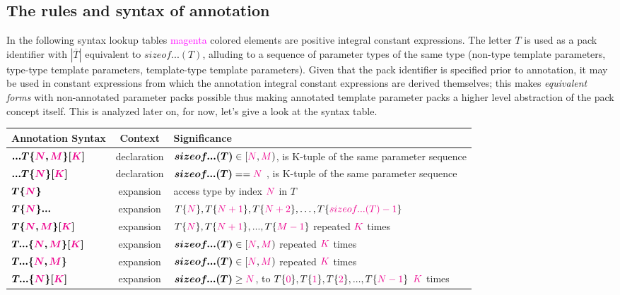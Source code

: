 
\subsection{The rules and syntax of annotation}

\p In the following syntax lookup tables \textcolor{Magenta}{magenta} colored elements are positive integral constant expressions.
The letter $T$ is used as a pack identifier with $|\overline{T}|$ equivalent to $sizeof...(T)$, alluding to a sequence of parameter types of the same type (non-type template parameters, type-type template parameters, template-type template parameters).
Given that the pack identifier is specified prior to annotation, it may be used in constant expressions from which the annotation integral constant expressions are derived themselves; this makes \textit{equivalent forms} with non-annotated parameter packs possible thus making annotated template parameter packs a higher level abstraction of the pack concept itself.
This is analyzed later on, for now, let's give a look at the syntax table.

\begin{tabularx}{\textwidth}{l|c|X}
  \textbf{Annotation Syntax} & \textbf{Context}  &\textbf{Significance} \\
\hline
$\bm{...T\{\textcolor{Magenta}{\textcolor{Magenta}{N}},\textcolor{Magenta}{M}\}[\textcolor{Magenta}{K}]}$ & declaration & $\bm{sizeof...(T)} \in [\textcolor{Magenta}{N},\textcolor{Magenta}{M})$, is K-tuple of the same parameter sequence \\
$\bm{...T\{\textcolor{Magenta}{N}\}[\textcolor{Magenta}{K}]}$ & declaration & $\bm{sizeof...(T)} == \textcolor{Magenta}{N}$ , is K-tuple of the same parameter sequence \\
$\bm{T\{\textcolor{Magenta}{N}\}}$ & expansion & access type by index $\textcolor{Magenta}{N}$ in $T$ \\
$\bm{T\{\textcolor{Magenta}{N}\}...}$ & expansion& $T\{\textcolor{Magenta}{N}\},T\{\textcolor{Magenta}{N+1}\},T\{\textcolor{Magenta}{N+2}\},\dots{},T\{\textcolor{Magenta}{sizeof...(T)-1}\}$ \\
$\bm{T\{\textcolor{Magenta}{N},\textcolor{Magenta}{M}\}[\textcolor{Magenta}{K}]}$ & expansion & $T\{\textcolor{Magenta}{N}\},T\{\textcolor{Magenta}{N+1}\},...,T\{\textcolor{Magenta}{M-1}\}$ repeated $\textcolor{Magenta}{K}$ times \\
$\bm{T...\{\textcolor{Magenta}{N},\textcolor{Magenta}{M}\}[\textcolor{Magenta}{K}]}$ & expansion & $\bm{sizeof...(T)} \in [\textcolor{Magenta}{N},\textcolor{Magenta}{M})$ repeated $\textcolor{Magenta}{K}$ times \\
$\bm{T...\{\textcolor{Magenta}{N},\textcolor{Magenta}{M}\}}$ & expansion & $\bm{sizeof...(T)} \in [\textcolor{Magenta}{N},\textcolor{Magenta}{M})$ repeated $\textcolor{Magenta}{K}$ times \\
$\bm{T...\{\textcolor{Magenta}{N}\}[\textcolor{Magenta}{K}]}$ & expansion & $\bm{sizeof...(T)}\geq{\textcolor{Magenta}{N}}$, to $T\{\textcolor{Magenta}{0}\},T\{\textcolor{Magenta}{1}\},T\{\textcolor{Magenta}{2}\},...,T\{\textcolor{Magenta}{N-1}\}$ $\textcolor{Magenta}{K}$ times\\
\end{tabularx}

